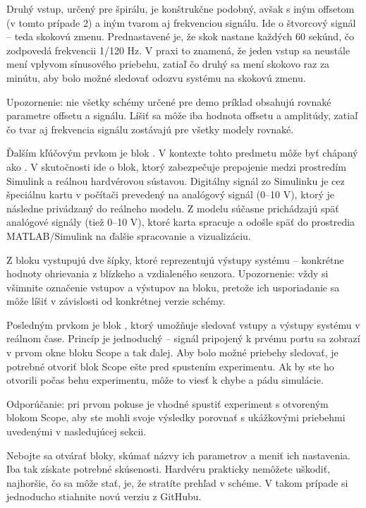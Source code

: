 \documentclass[a4paper, 10pt, ]{article}
\begin{document}
\noindent Druhý vstup, určený pre špirálu, je konštrukčne podobný, avšak s iným offsetom (v tomto prípade 2) a iným tvarom aj frekvenciou signálu. Ide o štvorcový signál – teda skokovú zmenu. Prednastavené je, že skok nastane každých 60 sekúnd, čo zodpovedá frekvencii 1/120 Hz. V praxi to znamená, že jeden vstup sa neustále mení vplyvom sínusového priebehu, zatiaľ čo druhý sa mení skokovo raz za minútu, aby bolo možné sledovať odozvu systému na skokovú zmenu.  

\noindent Upozornenie: nie všetky schémy určené pre demo príklad obsahujú rovnaké parametre offsetu a signálu. Líšiť sa môže iba hodnota offsetu a amplitúdy, zatiaľ čo tvar aj frekvencia signálu zostávajú pre všetky modely rovnaké.

\noindent Ďalším kľúčovým prvkom je blok . V kontexte tohto predmetu môže byť chápaný ako . V skutočnosti ide o blok, ktorý zabezpečuje prepojenie medzi prostredím Simulink a reálnou hardvérovou sústavou. Digitálny signál zo Simulinku je cez špeciálnu kartu v počítači prevedený na analógový signál (0–10 V), ktorý je následne privádzaný do reálneho modelu. Z modelu súčasne prichádzajú späť analógové signály (tiež 0–10 V), ktoré karta spracuje a odošle späť do prostredia MATLAB/Simulink na ďalšie spracovanie a vizualizáciu.  

\noindent Z bloku  vystupujú dve šípky, ktoré reprezentujú výstupy systému – konkrétne hodnoty ohrievania z blízkeho a vzdialeného senzora. Upozornenie: vždy si všimnite označenie vstupov a výstupov na bloku, pretože ich usporiadanie sa môže líšiť v závislosti od konkrétnej verzie schémy.  

\noindent Posledným prvkom je blok , ktorý umožňuje sledovať vstupy a výstupy systému v reálnom čase. Princíp je jednoduchý – signál pripojený k prvému portu sa zobrazí v prvom okne bloku Scope a tak ďalej. Aby bolo možné priebehy sledovať, je potrebné otvoriť blok Scope ešte pred spustením experimentu. Ak by ste ho otvorili počas behu experimentu, môže to viesť k chybe a pádu simulácie.  

\noindent Odporúčanie: pri prvom pokuse je vhodné spustiť experiment s otvoreným blokom Scope, aby ste mohli svoje výsledky porovnať s ukážkovými priebehmi uvedenými v nasledujúcej sekcii.  

\noindent Nebojte sa otvárať bloky, skúmať názvy ich parametrov a meniť ich nastavenia. Iba tak získate potrebné skúsenosti. Hardvéru prakticky nemôžete uškodiť, najhoršie, čo sa môže stať, je, že stratíte prehľad v schéme. V takom prípade si jednoducho stiahnite novú verziu z GitHubu.  
\end{document}
